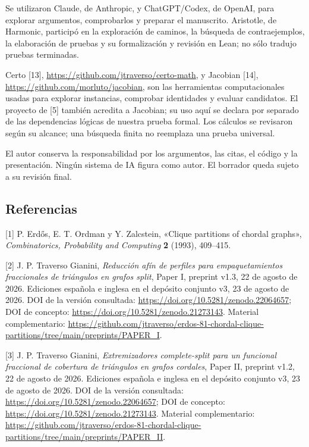 \documentclass[spanish,11pt,a4paper]{article}
\begin{document}
Se utilizaron Claude, de Anthropic, y ChatGPT/Codex, de OpenAI, para explorar argumentos, comprobarlos y preparar el manuscrito. Aristotle, de Harmonic, participó en la exploración de caminos, la búsqueda de contraejemplos, la elaboración de pruebas y su formalización y revisión en Lean; no sólo tradujo pruebas terminadas.

Certo {[}13{]}, \url{https://github.com/jtraverso/certo-math}, y Jacobian {[}14{]}, \url{https://github.com/morluto/jacobian}, son las herramientas computacionales usadas para explorar instancias, comprobar identidades y evaluar candidatos. El proyecto de {[}5{]} también acredita a Jacobian; su uso aquí se declara por separado de las dependencias lógicas de nuestra prueba formal. Los cálculos se revisaron según su alcance; una búsqueda finita no reemplaza una prueba universal.

El autor conserva la responsabilidad por los argumentos, las citas, el código y la presentación. Ningún sistema de IA figura como autor. El borrador queda sujeto a su revisión final.

\clearpage
\subsection{Referencias}
\begingroup\small\setlength{\parskip}{4pt}\label{referencias}

{[}1{]} P. Erdős, E. T. Ordman y Y. Zalcstein, «Clique partitions of chordal graphs», \emph{Combinatorics, Probability and Computing} \textbf{2} (1993), 409--415.

{[}2{]} J. P. Traverso Gianini, \emph{Reducción afín de perfiles para empaquetamientos fraccionales de triángulos en grafos split}, Paper I, preprint v1.3, 22 de agosto de 2026. Ediciones española e inglesa en el depósito conjunto v3, 23 de agosto de 2026. DOI de la versión consultada: \url{https://doi.org/10.5281/zenodo.22064657}; DOI de concepto: \url{https://doi.org/10.5281/zenodo.21273143}. Material complementario: \url{https://github.com/jtraverso/erdos-81-chordal-clique-partitions/tree/main/preprints/PAPER_I}.

{[}3{]} J. P. Traverso Gianini, \emph{Extremizadores complete-split para un funcional fraccional de cobertura de triángulos en grafos cordales}, Paper II, preprint v1.2, 22 de agosto de 2026. Ediciones española e inglesa en el depósito conjunto v3, 23 de agosto de 2026. DOI de la versión consultada: \url{https://doi.org/10.5281/zenodo.22064657}; DOI de concepto: \url{https://doi.org/10.5281/zenodo.21273143}. Material complementario: \url{https://github.com/jtraverso/erdos-81-chordal-clique-partitions/tree/main/preprints/PAPER_II}.
\end{document}

